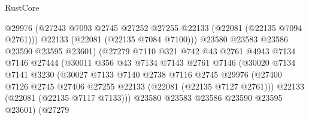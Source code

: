 \begin{lexlean}{RustCore}
\begin{coremodule}
                                  @29976
                                  (@27243
                                    @7093
                                    @2745
                                    @27252
                                    @27255
                                    @22133
                                    (@22081 (@22135 @7094 @2761)))
                                  @22133
                                  (@22081 (@22135 @7084 @7100)))
                                @23580
                                @23583
                                @23586
                                @23590
                                @23595
                                @23601)
                              (@27279
                                @7110
                                @321
                                @742
                                @43
                                @2761
                                @4943
                                @7134
                                @7146
                                @27444
                                (@30011
                                  @356
                                  @43
                                  @7134
                                  @7143
                                  @2761
                                  @7146
                                  (@30020
                                    @7134
                                    @7141
                                    @3230
                                    (@30027
                                      @7133
                                      @7140
                                      @2738
                                      @7116
                                      @2745
                                      @29976
                                      (@27400
                                        @7126
                                        @2745
                                        @27406
                                        @27255
                                        @22133
                                        (@22081 (@22135 @7127 @2761)))
                                      @22133
                                      (@22081 (@22135 @7117 @7133)))
                                    @23580
                                    @23583
                                    @23586
                                    @23590
                                    @23595
                                    @23601)
                                  (@27279

\end{coremodule}
\end{lexlean}
